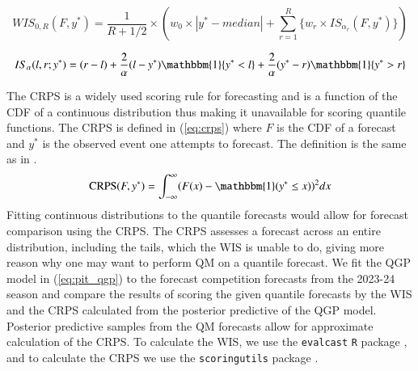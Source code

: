 \documentclass[preprint,12pt,authoryear]{elsarticle}
\begin{document}
\begin{equation}
\label{eq:wis}
        WIS_{0,R}(F, y^*) = \frac{1}{R + 1/2} \times (w_0\times |y^* - median| + \sum_{r=1}^R \{w_r \times IS_{\alpha_r}(F, y^*) \} )
\end{equation}

\begin{equation}
\label{eq:is}
        IS_{\alpha}(l,r;y^*) = (r-l) + \frac{2}{\alpha}(l - y^*)\mathbbm{1}\{y^* < l\} + \frac{2}{\alpha}(y^* - r) \mathbbm{1}\{y^* > r\}
\end{equation}

The CRPS is a widely used scoring rule for forecasting and is a function of the CDF of a continuous distribution thus making it unavailable for scoring quantile functions. The CRPS is defined in (\ref{eq:crps}) where $F$ is the CDF of a forecast and $y^*$ is the observed event one attempts to forecast. The definition is the same as in \cite{gneiting2014probabilistic}. 
\begin{equation}
    \label{eq:crps}
    \text{CRPS}(F, y^*) = \int_{-\infty}^{\infty} (F(x) - \mathbbm{1} (y^* \leq x))^2 dx
\end{equation}
Fitting continuous distributions to the quantile forecasts would allow for forecast comparison using the CRPS. The CRPS assesses a forecast across an entire distribution, including the tails, which the WIS is unable to do, giving more reason why one may want to perform QM on a quantile forecast. 
We fit the QGP model in (\ref{eq:pit_qgp}) to the forecast competition forecasts from the 2023-24 season and compare the results of scoring the given quantile forecasts by the WIS and the CRPS calculated from the posterior predictive of the QGP model. Posterior predictive samples from the QM forecasts allow for approximate calculation of the CRPS. 
To calculate the WIS, we use the \texttt{evalcast} \texttt{R} package \cite[]{mcdonald2023evalcast}, and to calculate the CRPS we use the \texttt{scoringutils} package \cite[]{jordan2019scoringutils}.
\end{document}
